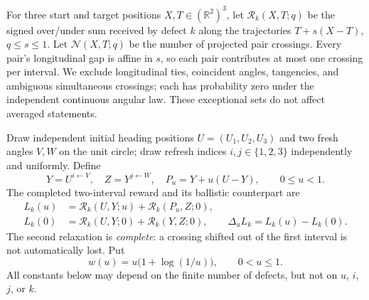 \documentclass[11pt]{article}
\theoremstyle{remark}\newtheorem{remark}[theorem]{Remark}
\newcommand{\R}{\mathcal R}
\newcommand{\N}{\mathcal N}
\begin{document}
For three start and target positions $X,T\in(\mathbb R^2)^3$, let $\R_k(X,T;q)$ be the signed over/under sum received by defect $k$ along the trajectories $T+s(X-T)$, $q\le s\le1$. Let $\N(X,T;q)$ be the number of projected pair crossings. Every pair's longitudinal gap is affine in $s$, so each pair contributes at most one crossing per interval. We exclude longitudinal ties, coincident angles, tangencies, and ambiguous simultaneous crossings; each has probability zero under the independent continuous angular law. These exceptional sets do not affect averaged statements.

Draw independent initial heading positions $U=(U_1,U_2,U_3)$ and two fresh angles $V,W$ on the unit circle; draw refresh indices $i,j\in\{1,2,3\}$ independently and uniformly. Define
\begin{equation}\label{eq:oneblock}
Y=U^{i\leftarrow V},\quad Z=Y^{j\leftarrow W},\quad P_u=Y+u(U-Y),\qquad 0\le u<1.
\end{equation}
The completed two-interval reward and its ballistic counterpart are
\begin{align}\label{eq:Lone}
L_k(u)&=\R_k(U,Y;u)+\R_k(P_u,Z;0),\\
L_k(0)&=\R_k(U,Y;0)+\R_k(Y,Z;0),\qquad \Delta_uL_k=L_k(u)-L_k(0).
\end{align}
The second relaxation is \emph{complete}: a crossing shifted out of the first interval is not automatically lost. Put
\begin{equation}\label{eq:w}
w(u)=u\bigl(1+\log(1/u)\bigr),\qquad 0<u\le1.
\end{equation}
All constants below may depend on the finite number of defects, but not on $u$, $i$, $j$, or $k$.
\end{document}
